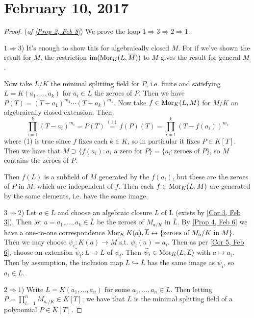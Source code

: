 \section{February 10, 2017}

\begin{proof}
	(\textit{of \ref{Prop 2, Feb 8}}) We prove the loop $1 \Rightarrow 3 \Rightarrow 2 \Rightarrow 1$.

	$1 \Rightarrow 3$) It's enough to show this for algebraically closed $M$. For if we've shown the result for $\overline{M}$, the restriction $\operatorname{im}(\operatorname{Mor}_K(L, \overline{M}))$ to $M$ gives the result for general $M$.

	Now take $L/K$ the minimal splitting field for $P$, i.e. finite and satisfying $L = K(a_1, ..., a_k)$ for $a_i \in L$ the zeroes of $P$. Then we have $P(T) = (T - a_1)^{m_1} \cdots (T - a_k)^{m_k}$. Now take $f \in \operatorname{Mor}_K(L, M)$ for $M/K$ an algebraically closed extension. Then
	\[\prod_{i = 1}^k (T - a_i)^{m_i} = P(T) \stackrel{(1)}{=} f(P)(T) = \prod_{i = 1}^k (T - f(a_i))^{m_i}\]
	where (1) is true since $f$ fixes each $k \in K$, so in particular it fixes $P \in K[T]$. Then we have that $M \supset \{f(a_i) \colon a_i \text{ a zero for } P\} = \{a_i \colon \text{zeroes of } P\}$, so $M$ contains the zeroes of $P$.

	Then $f(L)$ is a subfield of $M$ generated by the $f(a_i)$, but these are the zeroes of $P$ in $M$, which are independent of $f$. Then each $f \in \operatorname{Mor}_K(L, M)$ are generated by the same elements, i.e. have the same image.

	$3 \Rightarrow 2$) Let $a \in L$ and choose an algebraic closure $\overline{L}$ of L (exists by \ref{Cor 3, Feb 3}). Then let $a = a_1, ..., a_k \in \overline{L}$ be the zeroes of $M_{a/K}$ in $\overline{L}$. By \ref{Prop 4, Feb 6} we have a one-to-one correspondence $\operatorname{Mor}_K{K(a), \overline{L}} \leftrightarrow \{\text{zeroes of $M_a/K$ in } M\}$. Then we may choose $\psi_i \colon K(a) \rightarrow M$ s.t. $\psi_i(a) = a_i$. Then as per \ref{Cor 5, Feb 6}, choose an extension $\widetilde{\psi}_i \colon L \rightarrow \overline{L}$ of $\psi_i$. Then $\widetilde{\psi}_i \in \operatorname{Mor}_K(L, \overline{L})$ with $a \mapsto a_i$. Then by assumption, the inclusion map $L \hookrightarrow \overline{L}$ has the same image as $\widetilde{\psi}_i$, so $a_i \in L$.

	$2 \Rightarrow 1$) Write $L = K(a_1, ..., a_n)$ for some $a_1, ..., a_n \in L$. Then letting $P = \prod_{i = 1}^n M_{a_i/K} \in K[T]$, we have that $L$ is the minimal splitting field of a polynomial $P \in K[T]$.
\end{proof}

